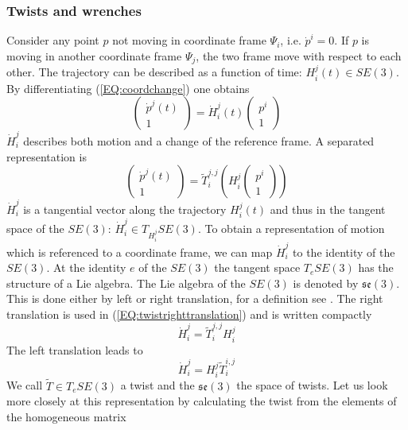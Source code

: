 \documentclass[a4paper,twoside, openright,12pt]{report}
\begin{document}
\subsubsection{Twists and wrenches}
Consider any point $ p $ not moving in coordinate frame $\Psi_i $, i.e. $ \dot{p}^i = 0 $. If $ p $ is moving in another coordinate frame $ \Psi_j $, the two frame move with respect to each other. The trajectory can be described as a function of time: $H_i^j(t) \in SE(3)$. By differentiating (\ref{EQ:coordchange}) one obtains
\[\begin{pmatrix}\dot{p}^j(t) \\ 1\end{pmatrix} = \dot{H}_i^j(t) \begin{pmatrix}p^i \\ 1\end{pmatrix} \]
$ \dot{H}_i^j $ describes both motion and a change of the reference frame. A separated representation is
\begin{equation}\label{EQ:twistrighttranslation}
	\begin{pmatrix}\dot{p}^j(t) \\ 1\end{pmatrix} = \tilde{T}_i^{j,j}\left(H_i^{j}\begin{pmatrix}p^i \\ 1\end{pmatrix}\right)
\end{equation}
$ \dot{H}_i^j$ is a tangential vector along the trajectory $H_i^j(t)$ and thus in the tangent space of the $SE(3)$: $ \dot{H}_i^j \in T_{H_i^j}SE(3)$. To obtain a representation of motion which is referenced to a coordinate frame, we can map $\dot{H}_i^j$ to the identity of the $SE(3)$. At the identity $ e $ of the $SE(3)$ the tangent space $ T_e SE(3) $ has the structure of a Lie algebra. The Lie algebra of the $SE(3)$ is denoted by $\mathfrak{se}(3)$. This is done either by left or right translation, for a definition see \cite{Stramigioli_01}. The right translation is used in (\ref{EQ:twistrighttranslation}) and is written compactly
\begin{equation}\label{EQ:righttranslation}
\dot{H}_i^j = \tilde{T}_i^{j,j} H_i^j
\end{equation}\label{EQ:lefttranslation}
The left translation leads to
\begin{equation}
\dot{H}_i^j = H_i^j \tilde{T}_i^{i,j} 
\end{equation}
We call $\tilde{T} \in T_e SE(3)$ a twist and the $\mathfrak{se}(3)$ the space of twists.
Let us look more closely at this representation by calculating the twist from the elements of the homogeneous matrix
\end{document}
